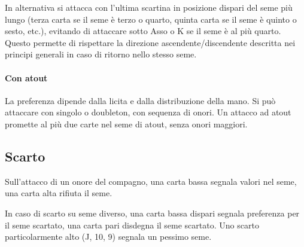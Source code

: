 \documentclass[a4paper,10pt]{article}
\begin{document}
In alternativa si attacca con l'ultima scartina in posizione dispari del seme più lungo (terza carta se il seme è terzo o quarto, quinta carta se il seme è quinto o sesto, etc.), evitando di attaccare sotto Asso o K se il seme è al più quarto. Questo permette di rispettare la direzione ascendente/discendente descritta nei principi generali in caso di ritorno nello stesso seme.

\paragraph{Con atout} La preferenza dipende dalla licita e dalla distribuzione della mano. Si può attaccare con singolo o doubleton, con sequenza di onori. Un attacco ad atout promette al più due carte nel seme di atout, senza onori maggiori.

\subsection{Scarto}

Sull'attacco di un onore del compagno, una carta bassa segnala valori nel seme, una carta alta rifiuta il seme.

In caso di scarto su seme diverso, una carta bassa dispari segnala preferenza per il seme scartato, una carta pari disdegna il seme scartato. Uno scarto particolarmente alto (J, 10, 9) segnala un pessimo seme.
\end{document}
